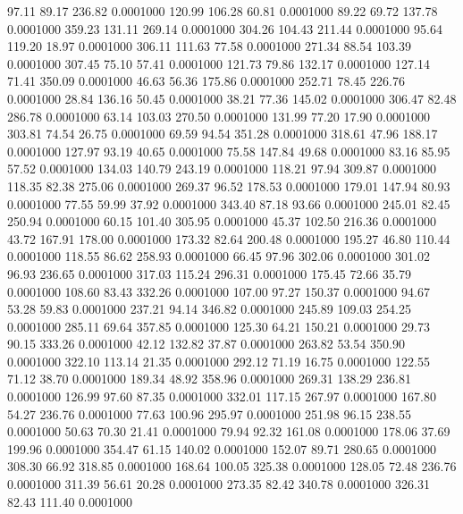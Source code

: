   97.11   89.17  236.82   0.0001000
 120.99  106.28   60.81   0.0001000
  89.22   69.72  137.78   0.0001000
 359.23  131.11  269.14   0.0001000
 304.26  104.43  211.44   0.0001000
  95.64  119.20   18.97   0.0001000
 306.11  111.63   77.58   0.0001000
 271.34   88.54  103.39   0.0001000
 307.45   75.10   57.41   0.0001000
 121.73   79.86  132.17   0.0001000
 127.14   71.41  350.09   0.0001000
  46.63   56.36  175.86   0.0001000
 252.71   78.45  226.76   0.0001000
  28.84  136.16   50.45   0.0001000
  38.21   77.36  145.02   0.0001000
 306.47   82.48  286.78   0.0001000
  63.14  103.03  270.50   0.0001000
 131.99   77.20   17.90   0.0001000
 303.81   74.54   26.75   0.0001000
  69.59   94.54  351.28   0.0001000
 318.61   47.96  188.17   0.0001000
 127.97   93.19   40.65   0.0001000
  75.58  147.84   49.68   0.0001000
  83.16   85.95   57.52   0.0001000
 134.03  140.79  243.19   0.0001000
 118.21   97.94  309.87   0.0001000
 118.35   82.38  275.06   0.0001000
 269.37   96.52  178.53   0.0001000
 179.01  147.94   80.93   0.0001000
  77.55   59.99   37.92   0.0001000
 343.40   87.18   93.66   0.0001000
 245.01   82.45  250.94   0.0001000
  60.15  101.40  305.95   0.0001000
  45.37  102.50  216.36   0.0001000
  43.72  167.91  178.00   0.0001000
 173.32   82.64  200.48   0.0001000
 195.27   46.80  110.44   0.0001000
 118.55   86.62  258.93   0.0001000
  66.45   97.96  302.06   0.0001000
 301.02   96.93  236.65   0.0001000
 317.03  115.24  296.31   0.0001000
 175.45   72.66   35.79   0.0001000
 108.60   83.43  332.26   0.0001000
 107.00   97.27  150.37   0.0001000
  94.67   53.28   59.83   0.0001000
 237.21   94.14  346.82   0.0001000
 245.89  109.03  254.25   0.0001000
 285.11   69.64  357.85   0.0001000
 125.30   64.21  150.21   0.0001000
  29.73   90.15  333.26   0.0001000
  42.12  132.82   37.87   0.0001000
 263.82   53.54  350.90   0.0001000
 322.10  113.14   21.35   0.0001000
 292.12   71.19   16.75   0.0001000
 122.55   71.12   38.70   0.0001000
 189.34   48.92  358.96   0.0001000
 269.31  138.29  236.81   0.0001000
 126.99   97.60   87.35   0.0001000
 332.01  117.15  267.97   0.0001000
 167.80   54.27  236.76   0.0001000
  77.63  100.96  295.97   0.0001000
 251.98   96.15  238.55   0.0001000
  50.63   70.30   21.41   0.0001000
  79.94   92.32  161.08   0.0001000
 178.06   37.69  199.96   0.0001000
 354.47   61.15  140.02   0.0001000
 152.07   89.71  280.65   0.0001000
 308.30   66.92  318.85   0.0001000
 168.64  100.05  325.38   0.0001000
 128.05   72.48  236.76   0.0001000
 311.39   56.61   20.28   0.0001000
 273.35   82.42  340.78   0.0001000
 326.31   82.43  111.40   0.0001000
